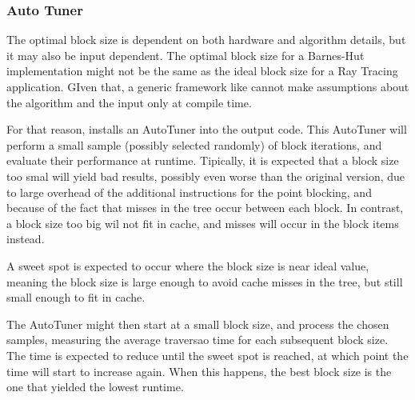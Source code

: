 \subsubsection{Auto Tuner}
\label{sec:optim:tuner}

The optimal block size is dependent on both hardware and algorithm details, but it may also be input dependent. The optimal block size for a Barnes-Hut implementation might not be the same as the ideal block size for a Ray Tracing application. GIven that, a generic framework like \treetiler cannot make assumptions about the algorithm and the input only at compile time.

For that reason, \treetiler installs an AutoTuner into the output code. This AutoTuner will perform a small sample (possibly selected randomly) of block iterations, and evaluate their performance at runtime.
Tipically, it is expected that a block size too smal will yield bad results, possibly even worse than the original version, due to large overhead of the additional instructions for the point blocking, and because of the fact that misses in the tree occur between each block. In contrast, a block size too big wil not fit in cache, and misses will occur in the block items instead.

A sweet spot is expected to occur where the block size is near ideal value, meaning the block size is large enough to avoid cache misses in the tree, but still small enough to fit in cache.

The AutoTuner might then start at a small block size, and process the chosen samples, measuring the average traversao time for each subsequent block size. The time is expected to reduce until the sweet spot is reached, at which point the time will start to increase again. When this happens, the best block size is the one that yielded the lowest runtime.